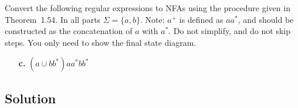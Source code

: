 \documentclass{article}
\begin{document}
\begin{empfile}
Convert the following regular expressions to NFAs using the
procedure given in Theorem~1.54. In all parts $\Sigma=\{a,b\}$.
Note: $a^+$ is defined as $aa^*$, and should be constructed as the
concatenation of $a$ with $a^*$. Do not simplify, and do not skip
steps. You only need to show the final state diagram.

\begin{enumerate}
\item[\bfseries c.] $(a\cup bb^*)aa^*bb^*$
\end{enumerate}

\subsection*{Solution}





%
% 
% 

\end{empfile}
\immediate{}
\end{document}
